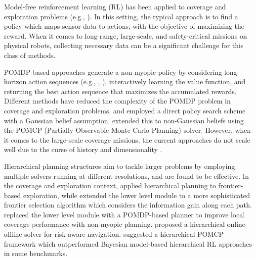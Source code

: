 \documentclass[letterpaper]{article} %
\newcommand{\phdone}[1]{} %
\begin{document}
\phdone{Coverage--(Model-free) RL-based approaches}
Model-free reinforcement learning (RL) has been applied to coverage and exploration problems (e.g., \cite{pathak_icm,burda2018study,rnd,ECR2018}). In this setting, the typical approach is to find a policy which maps sensor data to actions, with the objective of maximizing the reward. When it comes to long-range, large-scale, and safety-critical missions on physical robots, collecting necessary data can be a significant challenge for this class of methods.

\phdone{Coverage--(Model-based RL) POMDP approaches}
POMDP-based approaches generate a non-myopic policy by considering long-horizon action sequences (e.g., \cite{kurniawati2011motion}, \cite{bai2015intention}), interactively learning the value function, and returning the best action sequence that maximizes the accumulated rewards. Different methods have reduced the complexity of the POMDP problem in coverage and exploration problems. \citet{indelman2015planning} and \citet{martinez2009bayesian} employed a direct policy search scheme with a Gaussian belief assumption. \citet{Lauri2016planning} extended this to non-Gaussian beliefs using the POMCP (Partially Observable Monte-Carlo Planning) solver. %
However, when it comes to the large-scale coverage missions, %
the current approaches do not scale well due to the curse of history and dimensionality \cite{Pineau03}.

\phdone{Large scale--Hierarchical approaches}
Hierarchical planning structures \cite{kaelbling2011planning} aim to tackle larger problems by employing multiple solvers running at different resolutions, and are found to be effective.  
%
In the coverage and exploration context, \citet{umari2017autonomous} applied hierarchical planning to frontier-based exploration, while  \cite{dang2019explore} extended the lower level module to a more sophisticated frontier selection algorithm which considers the information gain along each path. \citet{Lauri2016planning} replaced the lower level module with a POMDP-based planner to improve local coverage performance with non-myopic planning. \citet{kim2019bi} proposed a hierarchical online-offline solver for risk-aware navigation. \citet{vien2015hierarchical} suggested a hierarchical POMCP framework which outperformed Bayesian model-based hierarchical RL approaches in some benchmarks.
\end{document}
